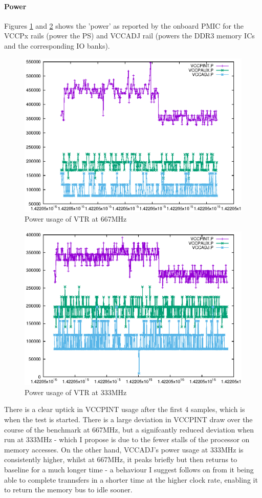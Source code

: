 \documentclass[a4paper]{article}
\begin{document}
  \paragraph{Power}
    Figures \ref{fig:vtr:pow:667} and \ref{fig:vtr:pow:333} shows the 'power' as reported by the onboard PMIC for the VCCPx rails (power the PS) and VCCADJ rail (powers the DDR3 memory ICs and the corresponding IO banks).
    \begin{figure}[p]
      \includegraphics[width=\textwidth]{data/fig/vtr:pow:667.eps}
      \caption{Power usage of VTR at 667MHz}
      \label{fig:vtr:pow:667}
    \end{figure}
    \begin{figure}[p]
      \includegraphics[width=\textwidth]{data/fig/vtr:pow:333.eps}
      \caption{Power usage of VTR at 333MHz}
      \label{fig:vtr:pow:333}
    \end{figure}
    There is a clear uptick in VCCPINT usage after the first 4 samples, which is when the test is started. There is a large deviation in VCCPINT draw over the course of the benchmark at 667MHz, but a signifcantly reduced deviation when run at 333MHz - which I propose is due to the fewer stalls of the processor on memory accesses. On the other hand, VCCADJ's power usage at 333MHz is consistently higher, whilst at 667MHz, it peaks briefly but then returns to baseline for a much longer time - a behaviour I suggest follows on from it being able to complete trannsfers in a shorter time at the higher clock rate, enabling it to return the memory bus to idle sooner.
\end{document}
